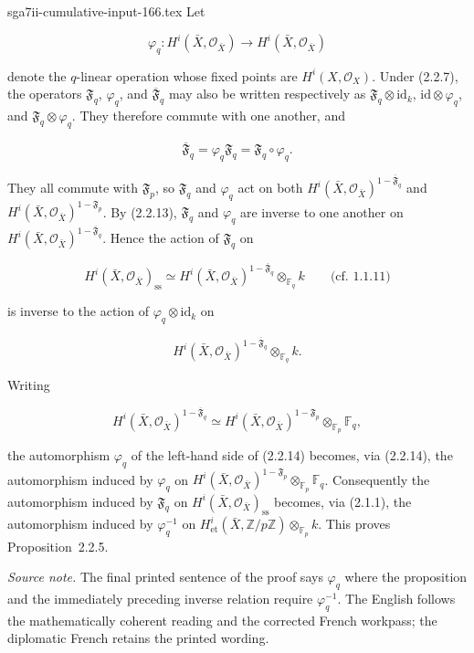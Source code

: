 \begin{filecontents*}{sga7ii-cumulative-input-166.tex}
Let

\begin{equation}\tag{2.2.12}
\varphi_q:H^i(\bar X,\mathcal O_{\bar X})
\longrightarrow H^i(\bar X,\mathcal O_{\bar X})
\end{equation}

denote the $q$-linear operation whose fixed points are
$H^i(X,\mathcal O_X)$. Under (2.2.7), the operators
$\mathfrak F_q$, $\varphi_q$, and $\overline{\mathfrak F}_q$ may also be
written respectively as
$\mathfrak F_q\otimes\mathrm{id}_k$,
$\mathrm{id}\otimes\varphi_q$, and
$\mathfrak F_q\otimes\varphi_q$. They therefore commute with one another,
and

\begin{equation}\tag{2.2.13}
\overline{\mathfrak F}_q
=\varphi_q\mathfrak F_q
=\mathfrak F_q\circ\varphi_q.
\end{equation}

They all commute with $\mathfrak F_p$, so $\mathfrak F_q$ and $\varphi_q$
act on both
$H^i(\bar X,\mathcal O_{\bar X})^{1-\overline{\mathfrak F}_q}$ and
$H^i(\bar X,\mathcal O_{\bar X})^{1-\mathfrak F_p}$. By (2.2.13),
$\mathfrak F_q$ and $\varphi_q$ are inverse to one another on
$H^i(\bar X,\mathcal O_{\bar X})^{1-\overline{\mathfrak F}_q}$. Hence the
action of $\mathfrak F_q$ on

\[
H^i(\bar X,\mathcal O_{\bar X})_{\mathrm{ss}}
\simeq
H^i(\bar X,\mathcal O_{\bar X})^{1-\overline{\mathfrak F}_q}
\otimes_{\mathbb F_q}k
\qquad\text{(cf. 1.1.11)}
\]

is inverse to the action of $\varphi_q\otimes\mathrm{id}_k$ on

\[
H^i(\bar X,\mathcal O_{\bar X})^{1-\overline{\mathfrak F}_q}
\otimes_{\mathbb F_q}k.
\]

Writing

\begin{equation}\tag{2.2.14}
H^i(\bar X,\mathcal O_{\bar X})^{1-\overline{\mathfrak F}_q}
\simeq
H^i(\bar X,\mathcal O_{\bar X})^{1-\mathfrak F_p}
\otimes_{\mathbb F_p}\mathbb F_q,
\end{equation}

the automorphism $\varphi_q$ of the left-hand side of (2.2.14) becomes,
via (2.2.14), the automorphism induced by $\varphi_q$ on
$H^i(\bar X,\mathcal O_{\bar X})^{1-\mathfrak F_p}
\otimes_{\mathbb F_p}\mathbb F_q$. Consequently the automorphism induced by
$\mathfrak F_q$ on
$H^i(\bar X,\mathcal O_{\bar X})_{\mathrm{ss}}$ becomes, via (2.1.1), the
automorphism induced by $\varphi_q^{-1}$ on
$H^i_{\mathrm{et}}(\bar X,\mathbb Z/p\mathbb Z)
\otimes_{\mathbb F_p}k$. This proves Proposition~2.2.5.

\medskip
\noindent\emph{Source note.}
The final printed sentence of the proof says $\varphi_q$ where the proposition
and the immediately preceding inverse relation require $\varphi_q^{-1}$.
The English follows the mathematically coherent reading and the corrected
French workpass; the diplomatic French retains the printed wording.
\end{filecontents*}
